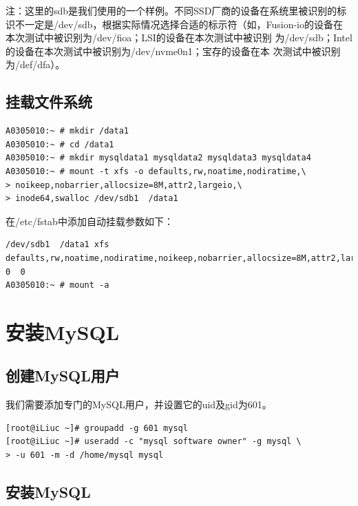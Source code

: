 注：这里的sdb是我们使用的一个样例。不同SSD厂商的设备在系统里被识别的标
识不一定是/dev/sdb，根据实际情况选择合适的标示符（如，Fusion-io的设备在
本次测试中被识别为/dev/fioa；LSI的设备在本次测试中被识别
为/dev/sdb；Intel的设备在本次测试中被识别为/dev/nvme0n1；宝存的设备在本
次测试中被识别为/def/dfa）。

\subsection{挂载文件系统}

\begin{verbatim}
A0305010:~ # mkdir /data1
A0305010:~ # cd /data1
A0305010:~ # mkdir mysqldata1 mysqldata2 mysqldata3 mysqldata4
A0305010:~ # mount -t xfs -o defaults,rw,noatime,nodiratime,\
> noikeep,nobarrier,allocsize=8M,attr2,largeio,\
> inode64,swalloc /dev/sdb1  /data1
\end{verbatim}

在/etc/fstab中添加自动挂载参数如下：
\begin{verbatim}
/dev/sdb1  /data1 xfs defaults,rw,noatime,nodiratime,noikeep,nobarrier,allocsize=8M,attr2,largeio,inode64,swalloc  0  0
A0305010:~ # mount -a
\end{verbatim}

\section{安装MySQL}
\subsection{创建MySQL用户}

我们需要添加专门的MySQL用户，并设置它的uid及gid为601。

\small{
\begin{verbatim}
[root@iLiuc ~]# groupadd -g 601 mysql
[root@iLiuc ~]# useradd -c "mysql software owner" -g mysql \
> -u 601 -m -d /home/mysql mysql
\end{verbatim}
}
\normalsize

\subsection{安装MySQL}

